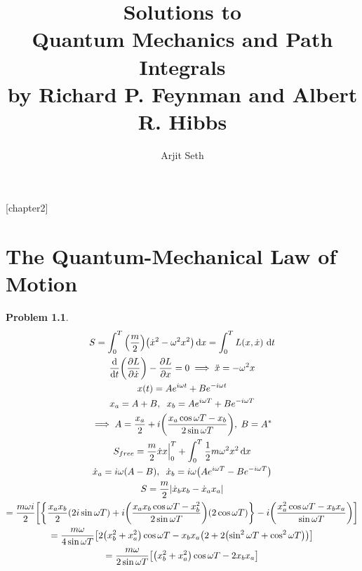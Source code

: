 \documentclass{report}
\theoremstyle{definition}
\begin{document}
\title{Solutions to \\ Quantum Mechanics and Path Integrals \\ by Richard P. Feynman and Albert R. Hibbs }

\author{Arjit Seth}
\date{}

\maketitle

\newtheorem{chapter2}{Problem}
[chapter2]

\chapter{The Quantum-Mechanical Law of Motion}

\begin{chapter2}
	\begin{gather*}
		S = \int_0^T \pqty{\frac{m}{2}}\pqty{\dot{x}^2 - \omega^2 x^2} \dd{x} = \int_0^T L(x, \dot{x})\,\dd{t} \\
		\dv{t}\pqty{\pdv{L}{\dot x}} - \pdv{L}{x} = 0 \implies \ddot{x} = -\omega^2 x \\
		x(t) = Ae^{i\omega t} + Be^{-i\omega t} \\
		x_a = A + B,\;\; x_b = Ae^{i\omega T} + Be^{-i\omega T} \\
		\implies A = \frac{x_a}{2} + i\pqty{\frac{x_a \cos\omega T - x_b}{2\sin\omega T}},\; B = A^* \\
		S_{free} = \frac{m}{2}\dot{x}x\Big|_0^T + \int_0^T \frac{1}{2}m\omega^2x^2 \dd{x} \\
		\dot{x}_a = i\omega\pqty{A - B}, \;\; \dot{x}_b = i\omega\pqty{Ae^{i\omega T} - Be^{-i\omega T}}\\
		S = \frac{m}{2}\abs{\dot{x}_b x_b - \dot{x}_a x_a} \\
		= \frac{m\omega i}{2}\bqty{\qty{\frac{x_a x_b}{2}\pqty{2i\sin \omega T} + i\pqty{\frac{x_a x_b \cos\omega T - x_b^2}{2\sin\omega T}}\pqty{2\cos\omega T}} - i\pqty{\frac{x_a^2 \cos\omega T - x_b x_a}{\sin\omega T}}} \\
		= \frac{m\omega}{4\sin\omega T}\bqty{2\pqty{x_b^2 + x_a^2} \cos\omega T - x_b x_a \pqty{2 + 2\pqty{\sin^2 \omega T + \cos^2 \omega T}}} \\
		= \frac{m\omega}{2\sin\omega T}\bqty{\pqty{x_b^2 + x_a^2}\cos\omega T - 2x_b x_a}
	\end{gather*}
\end{chapter2}
\end{document}
